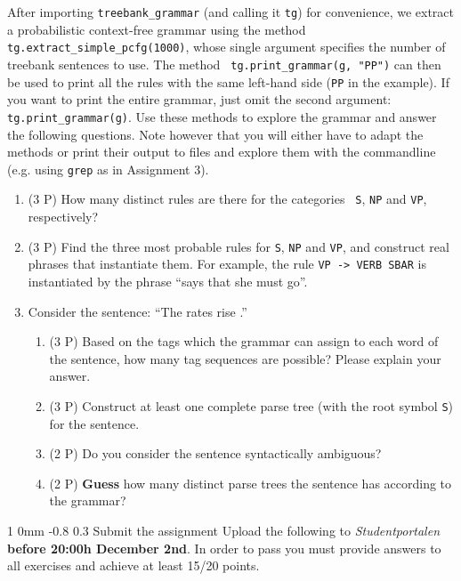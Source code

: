 \documentclass[11pt]{article}
\makeatletter
\newcommand{\newsec}[2]{\section{#1}\label{sec:#2}\noindent}
\renewcommand{\section}{\@startsection
{section}%
{1}%
{0mm}%
{-0.8\baselineskip}%
{0.3\baselineskip}%
{\bfseries\large}}%
\makeatother
\begin{document}
\begin{center}
\fbox{

}
\end{center}
After importing {\tt treebank\_grammar} (and calling it {\tt tg}) for
convenience, we extract a probabilistic context-free grammar using the
method {\tt tg.extract\_simple\_pcfg(1000)}, whose single argument
specifies the number of treebank sentences to use. The method {\tt
  tg.print\_grammar(g, "PP")} can then be used to print all the rules
with the same left-hand side ({\tt PP} in the example). If you want to
print the entire grammar, just omit the second argument: {\tt
  tg.print\_grammar(g)}. Use these methods to explore the grammar and
answer the following questions. Note however that you will either have
to adapt the methods or print their output to files and explore them
with the commandline (e.g. using {\tt grep} as in Assignment 3).
\begin{enumerate}[topsep=0.2cm,itemsep=0cm]
\item (3 P) How many distinct rules are there for the categories {\tt
    S}, {\tt NP} and {\tt VP}, respectively?
\item (3 P) Find the three most probable rules for {\tt S}, {\tt NP}
  and {\tt VP}, and construct real phrases that instantiate them.  For
  example, the rule {\tt VP -> VERB SBAR} is instantiated by the
  phrase ``says that she must go''.
\item Consider the sentence: ``The rates rise .''
  \begin{enumerate}[noitemsep,topsep=0cm]
  \item (3 P) Based on the tags which the grammar can assign to each
    word of the sentence, how many tag sequences are possible? Please
    explain your answer.
\item (3 P) Construct at least one complete parse tree (with the root
  symbol {\tt S}) for the sentence.
\item (2 P) Do you consider the sentence syntactically ambiguous?
\item (2 P) \textbf{Guess} how many distinct parse trees the sentence
  has according to the grammar?
\end{enumerate}
\end{enumerate}

\newsec{Submit the assignment}{sub}%
Upload the following to {\it Studentportalen}
\textbf{before 20:00h December 2nd}. In order to pass you must provide
answers to all exercises and achieve at least 15/20 points.
\begin{itemize}[noitemsep,topsep=0.2cm]
\item Well motivated answers to all questions in
  Section~\ref{sec:data}--\ref{sec:cfg} (\texttt{.pdf} format, written
  in \LaTeX}.
\item \textbf{[VG]}: In order to get the grade VG, reach at least 18
  points in the exercises above.
\end{itemize}
\end{document}
